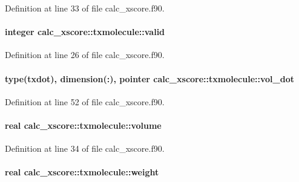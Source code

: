 Definition at line 33 of file calc\-\_\-xscore.\-f90.

\hypertarget{structcalc__xscore_1_1txmolecule_afce205b6bc558aba2f6e29c299e56c6c}{
\paragraph[{valid}]{\setlength{\rightskip}{0pt plus 5cm}integer calc\-\_\-xscore\-::txmolecule\-::valid}}\label{structcalc__xscore_1_1txmolecule_afce205b6bc558aba2f6e29c299e56c6c}


Definition at line 26 of file calc\-\_\-xscore.\-f90.

\hypertarget{structcalc__xscore_1_1txmolecule_a9e2cebdf3048e808f2f1f7610a75a031}{
\paragraph[{vol\-\_\-dot}]{\setlength{\rightskip}{0pt plus 5cm}type({\bf txdot}), dimension(\-:), pointer calc\-\_\-xscore\-::txmolecule\-::vol\-\_\-dot}}\label{structcalc__xscore_1_1txmolecule_a9e2cebdf3048e808f2f1f7610a75a031}


Definition at line 52 of file calc\-\_\-xscore.\-f90.

\hypertarget{structcalc__xscore_1_1txmolecule_a3c6f5949e89b0efeada81a433eaf7265}{
\paragraph[{volume}]{\setlength{\rightskip}{0pt plus 5cm}real calc\-\_\-xscore\-::txmolecule\-::volume}}\label{structcalc__xscore_1_1txmolecule_a3c6f5949e89b0efeada81a433eaf7265}


Definition at line 34 of file calc\-\_\-xscore.\-f90.

\hypertarget{structcalc__xscore_1_1txmolecule_ac0492d67e23ade9b96a8e46416df5fa8}{
\paragraph[{weight}]{\setlength{\rightskip}{0pt plus 5cm}real calc\-\_\-xscore\-::txmolecule\-::weight}}\label{structcalc__xscore_1_1txmolecule_ac0492d67e23ade9b96a8e46416df5fa8}


